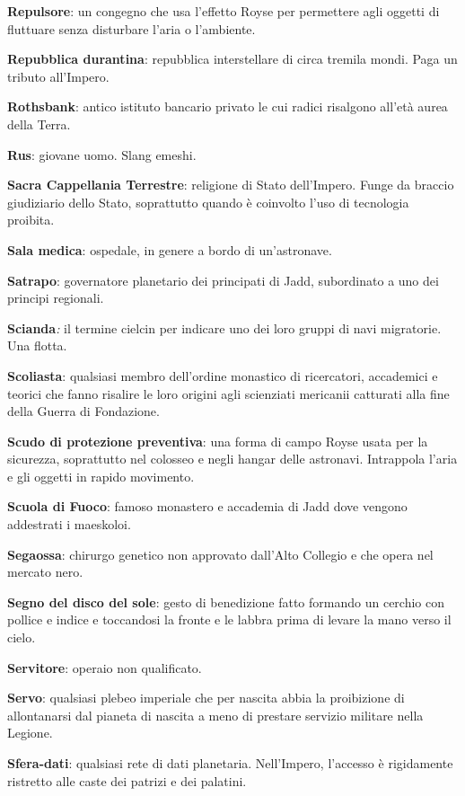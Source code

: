 \textbf{Repulsore}: un congegno che usa l'effetto Royse per permettere
agli oggetti di fluttuare senza disturbare l'aria o l'ambiente.

\textbf{Repubblica durantina}: repubblica interstellare di circa tremila
mondi. Paga un tributo all'Impero.

\textbf{Rothsbank}: antico istituto bancario privato le cui radici
risalgono all'età aurea della Terra.

\textbf{Rus}: giovane uomo. Slang emeshi.

\textbf{Sacra Cappellania Terrestre}: religione di Stato dell'Impero.
Funge da braccio giudiziario dello Stato, soprattutto quando è coinvolto
l'uso di tecnologia proibita.

\textbf{Sala medica}: ospedale, in genere a bordo di un'astronave.

\textbf{Satrapo}: governatore planetario dei principati di Jadd,
subordinato a uno dei principi regionali.

\textbf{Scianda}\emph{:} il termine cielcin per indicare uno dei loro
gruppi di navi migratorie. Una flotta.

\textbf{Scoliasta}: qualsiasi membro dell'ordine monastico di
ricercatori, accademici e teorici che fanno risalire le loro origini
agli scienziati mericanii catturati alla fine della Guerra di
Fondazione.

\textbf{Scudo di protezione preventiva}: una forma di campo Royse usata
per la sicurezza, soprattutto nel colosseo e negli hangar delle
astronavi. Intrappola l'aria e gli oggetti in rapido movimento.

\textbf{Scuola di Fuoco}: famoso monastero e accademia di Jadd dove
vengono addestrati i maeskoloi.

\textbf{Segaossa}: chirurgo genetico non approvato dall'Alto Collegio e
che opera nel mercato nero.

\textbf{Segno del disco del sole}: gesto di benedizione fatto formando
un cerchio con pollice e indice e toccandosi la fronte e le labbra prima
di levare la mano verso il cielo.

\textbf{Servitore}: operaio non qualificato.

\textbf{Servo}: qualsiasi plebeo imperiale che per nascita abbia la
proibizione di allontanarsi dal pianeta di nascita a meno di prestare
servizio militare nella Legione.

\textbf{Sfera-dati}: qualsiasi rete di dati planetaria. Nell'Impero,
l'accesso è rigidamente ristretto alle caste dei patrizi e dei palatini.


